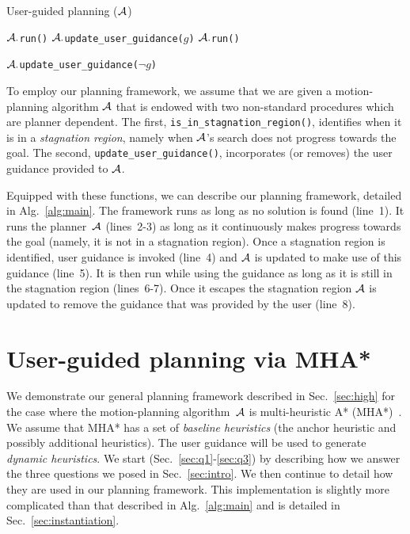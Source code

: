 \documentclass[conference]{IEEEtran}
\begin{document}
\algrenewcommand\algorithmicindent{.8em}
\begin{algorithm}[tb]
\caption{User-guided planning ($\mathcal{A}$)}
\label{alg:main}	
\begin{algorithmic}[1]
\small
{} 
		\State $\mathcal{A}.$\texttt{run()}
	\EndWhile
%	
	\State $\mathcal{A}.$\texttt{update\_user\_guidance($g$)}
		\State $\mathcal{A}.$\texttt{run()}
	\EndWhile

	\State $\mathcal{A}.$\texttt{update\_user\_guidance($\neg g$)}
\EndWhile
\end{algorithmic}
\end{algorithm}

To employ our planning framework, we assume that we are given a motion-planning algorithm $\mathcal{A}$ that is endowed with two non-standard procedures which are planner dependent.
The first, \texttt{is\_in\_stagnation\_region()}, 
identifies when it is in a \emph{stagnation region}, namely when $\mathcal{A}$'s search does not progress towards the goal. 
The second, \texttt{update\_user\_guidance()}, 
incorporates (or removes) the user guidance provided to $\mathcal{A}$. 

Equipped with these functions, we can describe our planning framework, detailed in Alg.~\ref{alg:main}.
The framework runs as long as no solution is found (line~1).
It runs the planner~$\mathcal{A}$ (lines~2-3) as long as it continuously makes progress towards the goal (namely, it is not in a stagnation region).
Once a stagnation region is identified, user guidance is invoked (line~4) and $\mathcal{A}$  is updated to make use of this guidance (line~5).
It is then run while using the guidance as long as it is still in the stagnation region (lines~6-7).
Once it escapes the stagnation region $\mathcal{A}$ is updated to remove the guidance that was provided by the user (line~8).


\section{User-guided planning via MHA*}
\label{sec:planning}

We demonstrate our general planning framework described in Sec.~\ref{sec:high} for the case where the motion-planning algorithm~$\mathcal{A}$ is multi-heuristic A* (MHA*)~\cite{ASNHL16}.
We assume that MHA* has a set of \emph{baseline heuristics} (the anchor heuristic and possibly additional heuristics).
The user guidance will be used to generate \emph{dynamic heuristics}.
We start (Sec.~\ref{sec:q1}-\ref{sec:q3}) by describing how we answer the three questions we posed in Sec.~\ref{sec:intro}.
We then continue to detail how they are used in our planning framework.
This implementation is slightly more complicated than that described in Alg.~\ref{alg:main} and is detailed in Sec.~\ref{sec:instantiation}.
\end{document}
